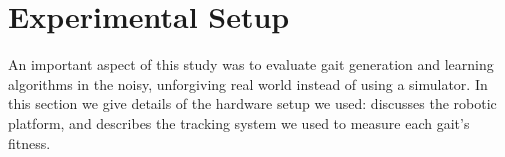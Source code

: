 \section{Experimental Setup}

An important aspect of this study was to evaluate gait generation and
learning algorithms in the noisy, unforgiving real world instead of
using a simulator.  In this section we give details of the hardware
setup we used:  discusses the robotic
platform, and  describes the tracking system
we used to measure each gait's fitness.





